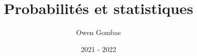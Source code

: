 \documentclass[french,a4paper,11pt]{report}
\title{Probabilités et statistiques}
\author{Owen Gombas}
\date{2021 - 2022}
\begin{document}
\maketitle
\tableofcontents{}



\end{document}
